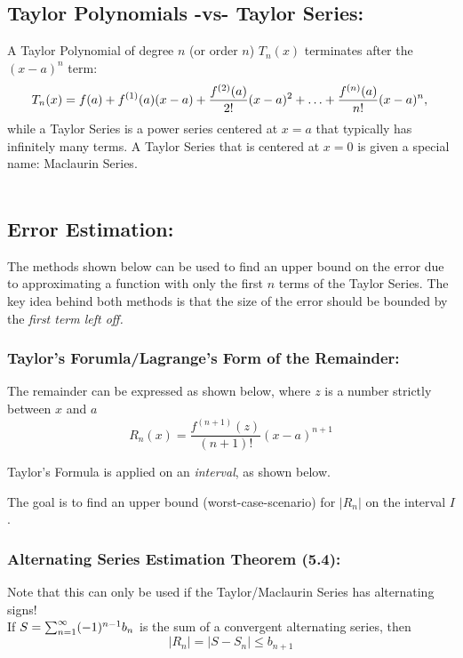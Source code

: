 \subsection*{Taylor Polynomials -vs- Taylor Series:}
 A Taylor Polynomial of degree \(n\) (or order \(n\)) \(T_n(x)\) terminates after the \((x-a)^n\) term:
\[
T_n(x) = f(a) + f^{(1)}(a)(x-a) + \frac{f^{(2)}(a)}{2!}(x-a)^2+\ldots+\frac{f^{(n)}(a)}{n!}(x-a)^n,\\
\]
while a Taylor Series is a power series centered at \(x=a\) that typically has infinitely many terms. A Taylor Series that is centered at \(x=0\) is given a special name: Maclaurin Series.\\~\\

\vspace*{.1in}

\subsection*{Error Estimation:}
The methods shown below can be used to find an upper bound on the error due to approximating a function with only the first \(n\) terms of the Taylor Series. The key idea behind both methods is that the size of the error should be bounded by the \textit{first term left off.}

\hspace*{.5\textwidth}%



\subsubsection*{Taylor's Forumla/Lagrange's Form of the Remainder:}
The remainder can be expressed as shown below, where \(z\) is a number strictly between \(x\) and \(a\)
\[
R_n(x) = \frac{f^{(n+1)}(z)}{(n+1)!}(x-a)^{n+1}
\]

Taylor's Formula is applied on an \textit{interval}, as shown below.

The goal is to find an upper bound (worst-case-scenario) for \(|R_n|\) on the interval \(I\).

\subsubsection*{Alternating Series Estimation Theorem (5.4):}
Note that this can only be used if the Taylor/Maclaurin Series has alternating signs!\\
If \(S = \sum_{n=1}^\infty (-1)^{n-1} b_n\) is the sum of a convergent alternating series, then 
\[
|R_n| = |S - S_n| \leq b_{n+1}
\]

